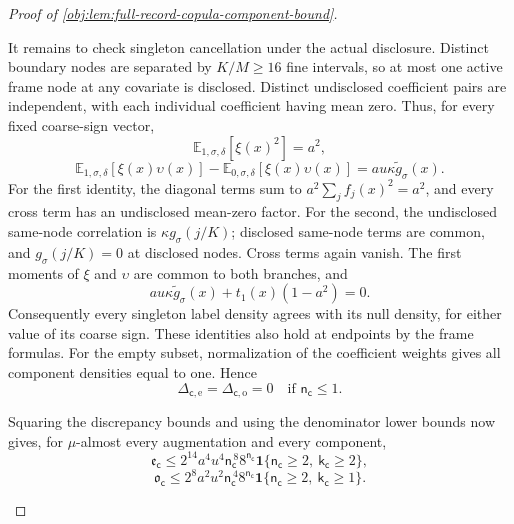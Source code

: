 \documentclass[11pt]{article}
\begin{document}
\begin{proof}[Proof of \cref{obj:lem:full-record-copula-component-bound}]
\begin{enumerate}
It remains to check singleton cancellation under the actual disclosure. Distinct boundary nodes are separated by \(K/M\ge16\) fine intervals, so at most one active frame node at any covariate is disclosed. Distinct undisclosed coefficient pairs are independent, with each individual coefficient having mean zero. Thus, for every fixed coarse-sign vector,
\[
\mathbb E_{1,\sigma,\delta}[\xi(x)^2]=a^2,
\]
\[
\mathbb E_{1,\sigma,\delta}[\xi(x)\upsilon(x)]
 -\mathbb E_{0,\sigma,\delta}[\xi(x)\upsilon(x)]
 =au\kappa\widetilde g_\sigma(x).
\]
For the first identity, the diagonal terms sum to \(a^2\sum_jf_j(x)^2=a^2\), and every cross term has an undisclosed mean-zero factor. For the second, the undisclosed same-node correlation is
\(\kappa g_\sigma(j/K)\); disclosed same-node terms are common, and
\(g_\sigma(j/K)=0\) at disclosed nodes. Cross terms again vanish. The first moments of \(\xi\) and \(\upsilon\) are common to both branches, and
\[
au\kappa\widetilde g_\sigma(x)
 +t_1(x)(1-a^2)=0.
\]
Consequently every singleton label density agrees with its null density, for either value of its coarse sign. These identities also hold at endpoints by the frame formulas. For the empty subset, normalization of the coefficient weights gives all component densities equal to one. Hence
\[
\Delta_{\mathsf c,\mathrm e}
 =\Delta_{\mathsf c,\mathrm o}=0
\quad\text{if }\mathsf n_{\mathsf c}\le1.
\]

Squaring the discrepancy bounds and using the denominator lower bounds now gives, for \(\mu\)-almost every augmentation and every component,
\[
\mathfrak e_{\mathsf c}
 \le
 2^{14}a^4u^4\mathsf n_{\mathsf c}^{\,8}
       8^{\mathsf n_{\mathsf c}}
 \mathbf1\{\mathsf n_{\mathsf c}\ge2,\
           \mathsf k_{\mathsf c}\ge2\},
\]
\[
\mathfrak o_{\mathsf c}
 \le
 2^8a^2u^2\mathsf n_{\mathsf c}^{\,4}
       8^{\mathsf n_{\mathsf c}}
 \mathbf1\{\mathsf n_{\mathsf c}\ge2,\
           \mathsf k_{\mathsf c}\ge1\}.
\]


\end{enumerate}
\end{proof}
\end{document}
